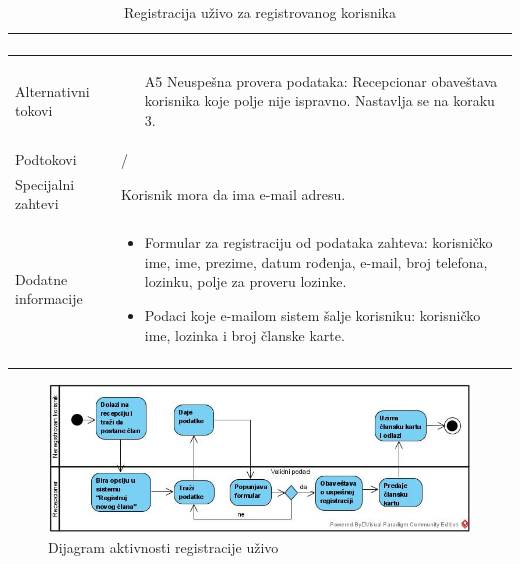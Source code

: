 \documentclass[../main.tex]{subfiles}
\begin{document}
\begin{longtable}{| p{} | p{} |}
\begin{enumerate}
    \end{enumerate}\\
\hline
    Alternativni tokovi & \begin{itemize}
        \item[A5] Neuspešna provera podataka: Recepcionar obaveštava korisnika koje polje nije ispravno. Nastavlja se na koraku 3.
    \end{itemize}\\
\hline
    Podtokovi & /\\
\hline
    Specijalni zahtevi & Korisnik mora da ima e-mail adresu.\\
\hline
    Dodatne informacije & \begin{itemize}
        \item Formular za registraciju od podataka zahteva: korisničko ime, ime, prezime, datum rođenja, e-mail, broj telefona, lozinku, polje za proveru lozinke.
        \item Podaci koje e-mailom sistem šalje korisniku: korisničko ime, lozinka i broj članske karte.
    \end{itemize} \\
\hline
\caption{Registracija uživo za registrovanog korisnika} %
\end{longtable}


\begin{figure}[!ht]
\begin{center}
\includegraphics[scale=0.55]{sections/images/Dijagram_aktivnsti_registracije_uzivo.jpg}
\end{center}
\caption{Dijagram aktivnosti registracije uživo}
\label{fig:kontekst}
\end{figure}
\end{document}

